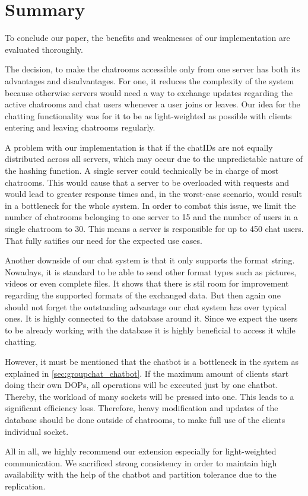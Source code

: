 \section{Summary}
\label{sec:summary}
To conclude our paper, the benefits and weaknesses of our implementation are evaluated thoroughly.

The decision, to make the chatrooms accessible only from one server has both its advantages and disadvantages. For one, it reduces the complexity of the system because otherwise servers would need a way to exchange updates regarding the active chatrooms and chat users whenever a user joins or leaves. Our idea for the chatting functionality was for it to be as light-weighted as possible with clients entering and leaving chatrooms regularly.

A problem with our implementation is that if the chatIDs are not equally distributed across all servers, which may occur due to the unpredictable nature of the hashing function. A single server could technically be in charge of most chatrooms. This would cause that a server to be overloaded with requests and would lead to greater response times and, in the worst-case scenario, would result in a bottleneck for the whole system. In order to combat this issue, we limit the number of chatrooms belonging to one server to 15 and the number of users in a single chatroom to 30. This means a server is responsible for up to 450 chat users. That fully satifies our need for the expected use cases.

Another downside of our chat system is that it only supports the format string. Nowadays, it is standard to be able to send other format types such as pictures, videos or even complete files. It shows that there is stil room for improvement regarding the supported formats of the exchanged data. But then again one should not forget the outstanding advantage our chat system has over typical ones. It is highly connected to the database around it. Since we expect the users to be already working with the database it is highly beneficial to access it while chatting.

However, it must be mentioned that the chatbot is a bottleneck in the system as explained in \ref{sec:groupchat_chatbot}. If the maximum amount of clients start doing their own DOPs, all operations will be executed just by one chatbot. Thereby, the workload of many sockets will be pressed into one. This leads to a significant efficiency loss. Therefore, heavy modification and updates of the database should be done outside of chatrooms, to make full use of the clients individual socket.

All in all, we highly recommend our extension especially for light-weighted communication. We sacrificed strong consistency in order to maintain high availability with the help of the chatbot and partition tolerance due to the replication.